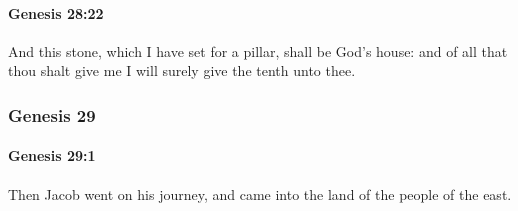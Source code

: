 		\paragraph{Genesis 28:22} %
			\label{GENESIS-28-22}

			And this stone, which I have set for a pillar, shall be God's house: and of all that thou shalt give me I will surely give the tenth unto thee.

	\subsubsection{Genesis 29} %
		\label{GENESIS-29}

		\paragraph{Genesis 29:1} %
			\label{GENESIS-29-1}

			Then Jacob went on his journey, and came into the land of the people of the east.

